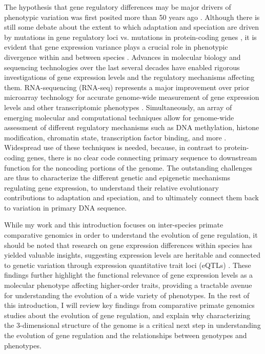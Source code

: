 The hypothesis that gene regulatory differences may be major drivers of phenotypic variation was first posited more than 50 years ago \cite{Britten.1969, Britten.1971s4}. Although there is still some debate about the extent to which adaptation and speciation are driven by mutations in gene regulatory loci vs. mutations in protein-coding genes \cite{Hoekstra.2007, Carroll.2008}, it is evident that gene expression variance plays a crucial role in phenotypic divergence within and between species \cite{Carroll.2005, Wray.2007, Gilad.2006, Frankel.2012, Stern.2008, Zheng.2011}. Advances in molecular biology and sequencing technologies over the last several decades have enabled rigorous investigations of gene expression levels and the regulatory mechanisms affecting them. RNA-sequencing (RNA-seq) represents a major improvement over prior microarray technology for accurate genome-wide measurement of gene expression levels and other transcriptomic phenotypes  \cite{Zhao.2014, Mantione.2014, Wang.2009, Marioni.2008}. Simultaneously, an array of emerging molecular and computational techniques allow for genome-wide assessment of different regulatory mechanisms such as DNA methylation, histone modification, chromatin state, transcription factor binding, and more \cite{Chen.2016}. Widespread use of these techniques is needed, because, in contrast to protein-coding genes, there is no clear code connecting primary sequence to downstream function for the noncoding portions of the genome. The outstanding challenges are thus to characterize the different genetic and epigenetic mechanisms regulating gene expression, to understand their relative evolutionary contributions to adaptation and speciation, and to ultimately connect them back to variation in primary DNA sequence.

While my work and this introduction focuses on inter-species primate comparative genomics in order to understand the evolution of gene regulation, it should be noted that research on gene expression differences within species has yielded valuable insights, suggesting expression levels are heritable and connected to genetic variation through expression quantitative trait loci (eQTLs) \cite{Majewski.2011, Gilad.2008}. These findings further highlight the functional relevance of gene expression levels as a molecular phenotype affecting higher-order traits, providing a tractable avenue for understanding the evolution of a wide variety of phenotypes. In the rest of this introduction, I will review key findings from comparative primate genomics studies about the evolution of gene regulation, and explain why characterizing the 3-dimensional structure of the genome is a critical next step in understanding the evolution of gene regulation and the relationships between genotypes and phenotypes.

